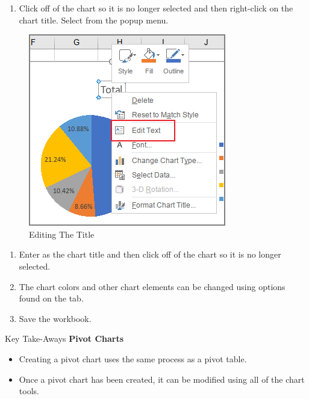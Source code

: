 \begin{enumerate}[resume]	
	\item Click off of the chart so it is no longer selected and then right-click on the chart title. Select  from the popup menu.
\end{enumerate}

\begin{figure}[H]
	\centering
	\includegraphics[width=\maxwidth{.95\linewidth}]{gfx/ch07_fig32}
	\caption{Editing The Title}
	\label{07:fig32}
\end{figure}

\begin{enumerate}[resume]	
	\item Enter  as the chart title and then click off of the chart so it is no longer selected.
	\item The chart colors and other chart elements can be changed using options found on the  tab.
	\item Save the workbook.
\end{enumerate}

\begin{center}
	\begin{tkwbox}{Key Take-Aways}
		\textbf{Pivot Charts}
		\\
		\begin{itemize}
			\setlength{\itemsep}{0pt}
			\setlength{\parskip}{0pt}
			\setlength{\parsep}{0pt}
			
			\item Creating a pivot chart uses the same process as a pivot table.
			\item Once a pivot chart has been created, it can be modified using all of the chart tools.
			
		\end{itemize}
	\end{tkwbox}
\end{center}


